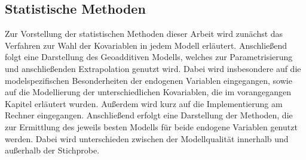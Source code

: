 \documentclass{Vorlage}
\begin{document}
\begin{table}[h]
\centering
\caption{Sozioökonomische und geographische Variablen der Gebäude- und Wohnungszählung im Rahmen des Zensus und deren Anzahl der Ausprägungen.}
\label{Var_Zensus}
\end{table}

\newpage

\subsection{Statistische Methoden}

Zur Vorstellung der statistischen Methoden dieser Arbeit wird zunächst das Verfahren zur Wahl der Kovariablen in jedem Modell erläutert. Anschließend folgt eine Darstellung des Geoadditiven Modells, welches zur Parametrisierung und anschließenden Extrapolation genutzt wird. Dabei wird insbesondere auf die modelspezifischen Besonderheiten der endogenen Variablen eingegangen, sowie auf die Modellierung der unterschiedlichen Kovariablen, die im vorangegangen Kapitel erläutert wurden. Außerdem wird kurz auf die Implementierung am Rechner eingegangen. Anschließend erfolgt eine Darstellung der Methoden, die zur Ermittlung des jeweils besten Modells für beide endogene Variablen genutzt werden. Dabei wird unterschieden zwischen der Modellqualität innerhalb und außerhalb der Stichprobe. 
\end{document}
